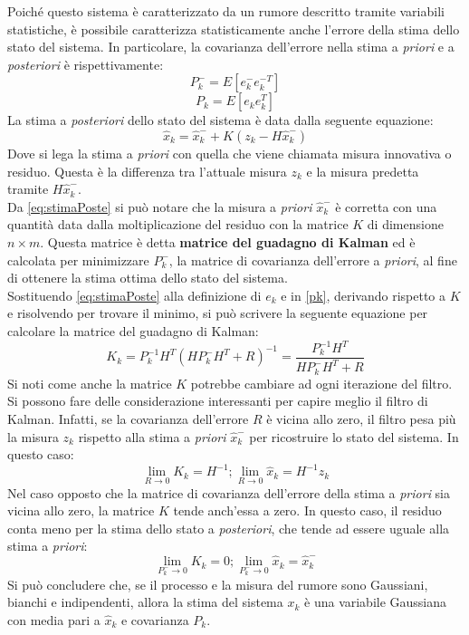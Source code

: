 Poiché questo sistema è caratterizzato da un rumore descritto tramite variabili statistiche, è possibile caratterizza statisticamente anche l'errore della stima dello stato del sistema. In particolare, la covarianza dell'errore nella stima a \textit{priori} e a \textit{posteriori} è rispettivamente:
\begin{equation}
P_k^- = E[e_k^-e_k^{-T}]
\end{equation}
\begin{equation}
\label{pk}
P_k = E[e_ke_k^{T}]
\end{equation}
La stima a \textit{posteriori} dello stato del sistema è data dalla seguente equazione:
\begin{equation}
\label{eq:stimaPoste}
\hat{x}_k= \hat{x}_k^- + K ( z_k - H \hat{x}_k^-)
\end{equation}
Dove si lega la stima a \textit{priori} con quella che viene chiamata misura innovativa o residuo. Questa è la differenza tra l'attuale misura $z_k$ e la misura predetta tramite $H\hat{x}_k^-$.\\
Da \ref{eq:stimaPoste} si può notare che la misura a \textit{priori} $\hat{x}_k^-$ è corretta con una quantità data dalla moltiplicazione del residuo con la matrice $K$ di dimensione $n \times m$. Questa matrice è detta \textbf{matrice del guadagno di Kalman} ed è calcolata per minimizzare $P_k^-$, la matrice di covarianza dell'errore a \textit{priori}, al fine di ottenere la stima ottima dello stato del sistema.\\
Sostituendo \ref{eq:stimaPoste} alla definizione di $e_k$ e in \ref{pk}, derivando rispetto a $K$ e risolvendo per trovare il minimo, si può scrivere la seguente equazione per calcolare la matrice del guadagno di Kalman:
\begin{equation}
K_k = P_k^{-1} H^T ( HP_k^- H^T + R)^{-1} = \dfrac{P_k^{-1}H^T}{HP_k^-H^T + R}
\end{equation}
Si noti come anche la matrice $K$ potrebbe cambiare ad ogni iterazione del filtro. Si possono fare delle considerazione interessanti per capire meglio il filtro di Kalman. Infatti, se la covarianza dell'errore $R$ è vicina allo zero, il filtro pesa più la misura $z_k$ rispetto alla stima a \textit{priori} $\hat{x}_k^-$ per ricostruire lo stato del sistema. In questo caso:
\begin{equation}
\lim\limits_{R\rightarrow0}K_k=H^{-1};  \lim\limits_{R\rightarrow0}\hat{x}_k= H^{-1}z_k
\end{equation}
Nel caso opposto che la matrice di covarianza dell'errore della stima a \textit{priori} sia vicina allo zero, la matrice $K$ tende anch'essa a zero. In questo caso, il residuo conta meno per la stima dello stato a \textit{posteriori}, che tende ad essere uguale alla stima a \textit{priori}:
\begin{equation}
\lim\limits_{P_k^-\rightarrow0}K_k=0;  \lim\limits_{P_k^-\rightarrow0}\hat{x}_k=  \hat{x}_k^-
\end{equation}
Si può concludere che, se il processo e la misura del rumore sono Gaussiani, bianchi e indipendenti, allora la stima del sistema $x_k$ è una variabile Gaussiana con media pari a $\hat{x}_k$ e covarianza $P_k$.

